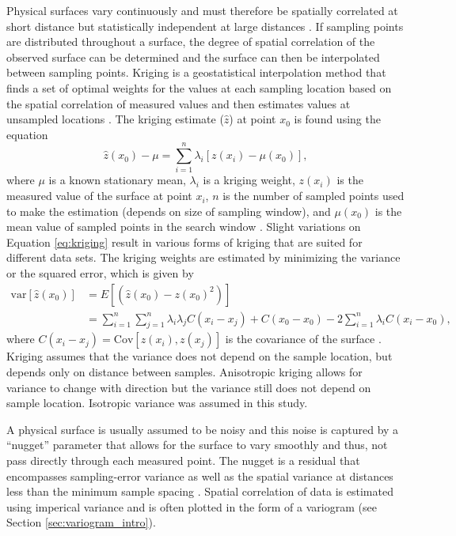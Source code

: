 \documentclass{sfuthesis}
\begin{document}
Physical surfaces vary continuously and must therefore be spatially correlated at short distance but statistically independent at large distances \citep{Davis1986}. If sampling points are distributed throughout a surface, the degree of spatial correlation of the observed surface can be determined and the surface can then be interpolated between sampling points. Kriging is a geostatistical interpolation method that finds a set of optimal weights for the values at each sampling location based on the spatial correlation of measured values and then estimates values at unsampled locations \citep{Davis1986, Li2014}. The kriging estimate ($\hat{z}$) at point $x_0$ is found using the equation
\begin{equation}
\label{eq:kriging}
\hat{z}(x_0) - \mu = \sum_{i=1}^{n} \lambda_i [z(x_i)-\mu(x_0)],
\end{equation}
where $\mu$ is a known stationary mean, $\lambda_i$ is a kriging weight, $z(x_i)$ is the measured value of the surface at point $x_i$, $n$ is the number of sampled points used to make the estimation (depends on size of sampling window), and $\mu(x_0)$ is the mean value of sampled points in the search window \citep{Wackernagel2003, Li2008}. Slight variations on Equation \ref{eq:kriging} result in various forms of kriging that are suited for different data sets. The kriging weights are estimated by minimizing the variance or the squared error, which is given by
\begin{align}
\mathrm{var}[\hat{z}(x_0)] &= E[(\hat{z}(x_0)-z(x_0)^2)]\\
&=\sum_{i=1}^{n}\sum_{j=1}^{n}\lambda_i \lambda_j C(x_i-x_j)+C(x_0-x_0)-2 \sum_{i=1}^{n} \lambda_i C(x_i-x_0),
\end{align}
where $C(x_i-x_j) = \mathrm{Cov}[z(x_i),z(x_j)]$ is the covariance of the surface \citep{Li2008}. Kriging assumes that the variance does not depend on the sample location, but depends only on distance between samples.  Anisotropic kriging allows for variance to change with direction but the variance still does not depend on sample location. Isotropic variance was assumed in this study.

A physical surface is usually assumed to be noisy and this noise is captured by a ``nugget'' parameter that allows for the surface to vary smoothly and thus, not pass directly through each measured point. The nugget is a residual that encompasses sampling-error variance as well as the spatial variance at distances less than the minimum sample spacing \citep{Li2008}. Spatial correlation of data is estimated using imperical variance and is often plotted in the form of a variogram (see Section \ref{sec:variogram_intro}).  
\end{document}
